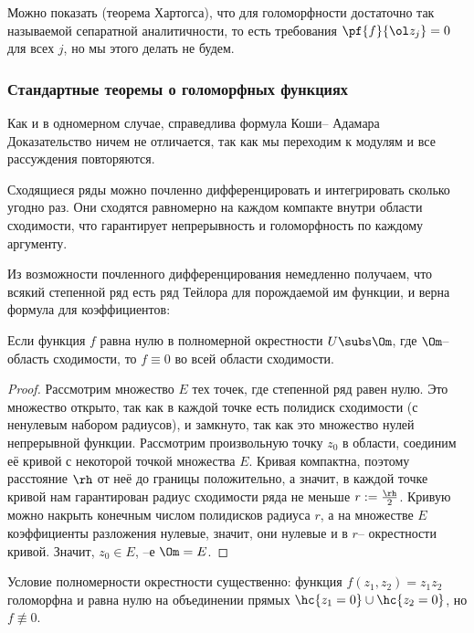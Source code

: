 \documentclass[a4paper]{article}
\begin{document}
\begin{note}
Можно показать (теорема Хартогса), что для голоморфности достаточно так называемой сепаратной
аналитичности, то есть требования $\pf{f}{\ol z_j}=0$ для всех $j$, но мы этого делать не будем.
\end{note}

\subsubsection{Стандартные теоремы о голоморфных функциях}

Как и в одномерном случае, справедлива формула Коши-- Адамара
Доказательство ничем не отличается, так как мы переходим к модулям и все рассуждения повторяются.

Сходящиеся ряды можно почленно дифференцировать и интегрировать сколько угодно раз. Они сходятся
равномерно на каждом компакте внутри области сходимости, что гарантирует непрерывность и голоморфность по
каждому аргументу.

Из возможности почленного дифференцирования немедленно получаем, что всякий степенной ряд есть ряд Тейлора
для порождаемой им функции, и верна формула для коэффициентов:

\begin{theorem}[единственности]
Если функция $f$ равна нулю в полномерной окрестности $U\subs \Om$, где $\Om$-- область сходимости,
то $f\equiv0$ во всей области сходимости.
\end{theorem}
\begin{proof}
Рассмотрим множество $E$ тех точек, где степенной ряд равен нулю. Это множество открыто,
так как в каждой точке есть полидиск сходимости (с ненулевым набором радиусов), и замкнуто,
так как это множество нулей непрерывной функции. Рассмотрим произвольную точку $z_0$ в области, соединим её
кривой с некоторой точкой множества $E$. Кривая компактна, поэтому расстояние $\rh$ от неё до границы положительно,
а значит, в каждой точке кривой нам гарантирован радиус сходимости ряда не меньше $r := \frac\rh2$. Кривую
можно накрыть конечным числом полидисков радиуса $r$, а на множестве $E$ коэффициенты разложения нулевые, значит, они нулевые
и в $r$-- окрестности кривой. Значит, $z_0\in E$, --е $\Om=E$.
\end{proof}

\begin{note}
Условие полномерности окрестности существенно: функция $f(z_1,z_2)=z_1z_2$ голоморфна и равна
нулю на объединении прямых $\hc{z_1=0}\cup \hc{z_2=0}$, но $f\not\equiv0$.
\end{note}
\end{document}
